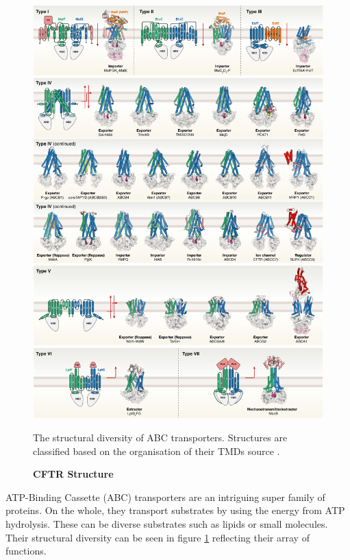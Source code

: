 \begin{figure}
	\label{ABC_diversity}
	\begin{center}
	\includegraphics[width=\textwidth]{figures/ABC_classification.jpg}
	\end{center}
	\captionsetup{singlelinecheck = false, justification=raggedright}
	\caption[CFTR Structure] {\textbf{CFTR Structure}}{The structural diversity of ABC transporters. Structures are classified based on the organisation of their TMDs source \cite{thomas2020}.} 
\end{figure}
ATP-Binding Cassette (ABC) transporters are an intriguing super family of proteins. On the whole, they transport substrates by using the energy from ATP hydrolysis. These can be diverse substrates such as lipids or small molecules. Their structural diversity can be seen in figure \ref{ABC_diversity} reflecting their array of functions. 

